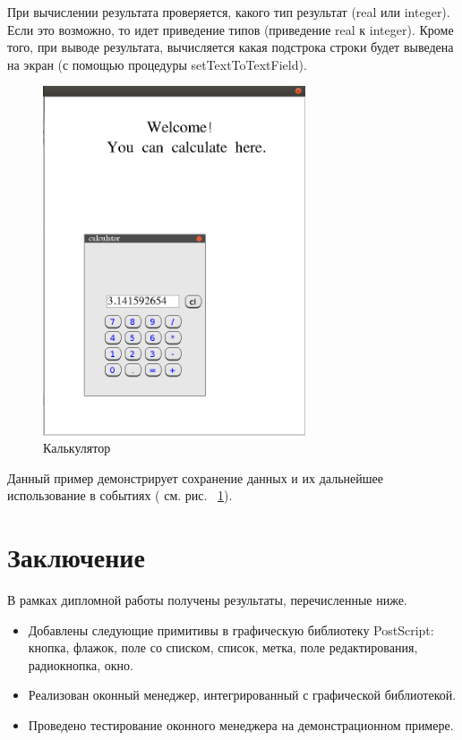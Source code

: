 \documentclass[14pt]{extarticle}
\begin{document}
	При вычислении результата проверяется, какого тип результат (real или integer). Если это возможно, то идет приведение типов (приведение real к integer). Кроме того, при выводе результата, вычисляется какая подстрока строки будет выведена на экран (с помощью процедуры setTextToTextField).
	
	
	\begin{figure}[h]
		\begin{center}
		\begin{minipage}[h]{0.4\linewidth}
		\includegraphics[width=220pt]{pictures/filledCalc.png}
		\caption{ Калькулятор} %
		\label{calculator} %
		\end{minipage}
		\end{center}
		\end{figure}
		
	Данный пример демонстрирует сохранение данных и их дальнейшее использование в событиях ( см. рис. ~\ref{calculator}).
	
	\pagebreak
	\section*{Заключение}
	
	В рамках дипломной работы получены результаты, перечисленные ниже.
	\begin{itemize}
		\item Добавлены следующие примитивы в графическую библиотеку  PostScript: кнопка, флажок, поле со списком, список, метка, поле редактирования, радиокнопка, окно.
		\item Реализован оконный менеджер, интегрированный с графической библиотекой.
		\item Проведено тестирование оконного менеджера на демонстрационном примере.
	\end{itemize}
	
\end{document}
